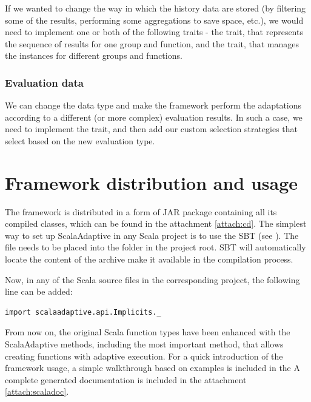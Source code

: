 If we wanted to change the way in which the history data are stored (by filtering some of the results, performing some aggregations to save space, etc.), we would need to implement one or both of the following traits - the  trait, that represents the sequence of results for one group and function, and the  trait, that manages the  instances for different groups and functions.

\subsubsection{Evaluation data}

We can change the  data type and make the framework perform the adaptations according to a different (or more complex) evaluation results. In such a case, we need to implement the  trait, and then add our custom selection strategies that select based on the new evaluation type.

\section{Framework distribution and usage}

The framework is distributed in a form of JAR package containing all its compiled classes, which can be found in the attachment \ref{attach:cd}. The simplest way to set up ScalaAdaptive in any Scala project is to use the SBT (see \cite{noauthor_sbt_nodate}). The  file needs to be placed into the  folder in the project root. SBT will automatically locate the content of the archive make it available in the compilation process.

Now, in any of the Scala source files in the corresponding project, the following line can be added:
\lstset{style=Scala}
\begin{lstlisting}
import scalaadaptive.api.Implicits._
\end{lstlisting}

From now on, the original Scala function types have been enhanced with the ScalaAdaptive methods, including the most important  method, that allows creating functions with adaptive execution. For a quick introduction of the framework usage, a simple walkthrough based on examples is included in the  A complete generated documentation is included in the attachment \ref{attach:scaladoc}.
